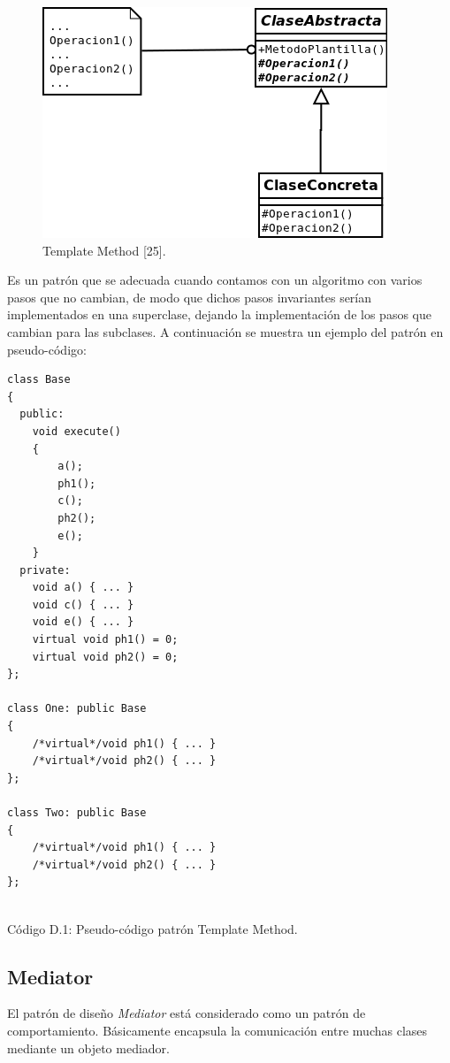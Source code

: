 \begin{figure}[h!]
	\centering
		\includegraphics[scale=0.5]{image/templateMethod.png}
	\caption{Template Method [25].}
	\label{} 
\end{figure}

\par Es un patrón que se adecuada cuando contamos con un algoritmo con varios pasos que no cambian, de modo que dichos pasos invariantes serían implementados en una superclase, dejando la implementación de los pasos que cambian para las subclases. A continuación se muestra un ejemplo del patrón en pseudo-código:

\begin{lstlisting}[basicstyle=\tt, frame=trBL, tabsize=4,fontadjust=true]
class Base
{
  public:
    void execute()
    {
        a();
        ph1();
        c();
        ph2();
        e();
    }
  private:
    void a() { ... }
    void c() { ... }
    void e() { ... }    
    virtual void ph1() = 0;
    virtual void ph2() = 0;
};

class One: public Base
{
    /*virtual*/void ph1() { ... }
    /*virtual*/void ph2() { ... }    
};

class Two: public Base
{
 	/*virtual*/void ph1() { ... }
    /*virtual*/void ph2() { ... }       
};
	
\end{lstlisting}
\hspace*{2cm}\caption{Código D.1: Pseudo-código patrón Template Method.}

\subsection{Mediator}
\label{mediator}
\par El patrón de diseño \emph{Mediator} está considerado como un patrón de comportamiento. Básicamente encapsula la comunicación entre muchas clases mediante un objeto mediador.

